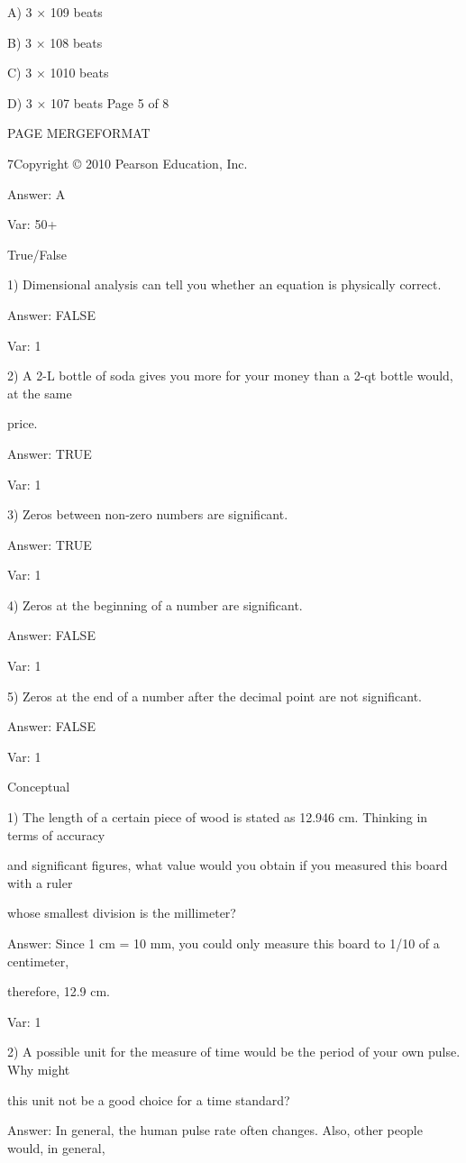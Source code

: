 A) 3 × 109 beats

B) 3 × 108 beats

C) 3 × 1010 beats

D) 3 × 107 beats
Page 5 of 8

PAGE \* MERGEFORMAT

7Copyright © 2010 Pearson Education, Inc.

Answer: A

Var: 50+

True/False

1) Dimensional analysis can tell you whether an equation is physically correct.

Answer: FALSE

Var: 1

2) A 2-L bottle of soda gives you more for your money than a 2-qt bottle would, at the same

price.

Answer: TRUE

Var: 1

3) Zeros between non-zero numbers are significant.

Answer: TRUE

Var: 1

4) Zeros at the beginning of a number are significant.

Answer: FALSE

Var: 1

5) Zeros at the end of a number after the decimal point are not significant.

Answer: FALSE

Var: 1

Conceptual

1) The length of a certain piece of wood is stated as 12.946 cm. Thinking in terms of accuracy

and significant figures, what value would you obtain if you measured this board with a ruler

whose smallest division is the millimeter?

Answer: Since 1 cm = 10 mm, you could only measure this board to 1/10 of a centimeter,

therefore, 12.9 cm.

Var: 1

2) A possible unit for the measure of time would be the period of your own pulse. Why might

this unit not be a good choice for a time standard?

Answer: In general, the human pulse rate often changes. Also, other people would, in general,

